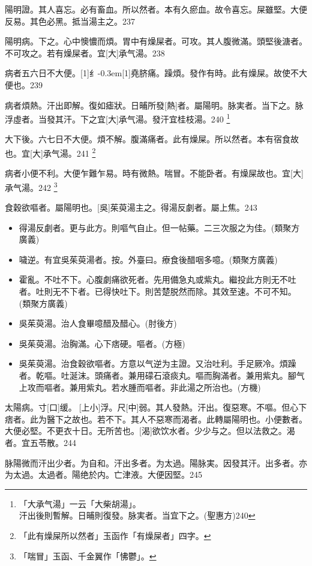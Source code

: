 \documentclass[oneside,b4paper]{ctexbook}
\begin{document}
\begin{flushleft}
陽明證。其人喜忘。必有畜血。所以然者。本有久瘀血。故令喜忘。屎雖堅。大便反易。其色必黑。抵当湯主之。237

陽明病。下之。心中懊憹而煩。胃中有燥屎者。可攻。其人腹微滿。頭堅後溏者。不可攻之。若有燥屎者。宜[大]承气湯。238

病者五六日不大便。{\hbox{\scalebox{0.6}[1]{纟}\kern-0.3em\scalebox{0.63}[1]{堯}}}脐痛。躁煩。發作有時。此有燥屎。故使不大便也。239

病者煩熱。汗出即解。復如瘧狀。日晡所發[熱]者。屬陽明。脉実者。当下之。脉浮虛者。当發其汗。下之宜[大]承气湯。發汗宜桂枝湯。240
\footnote{「大承气湯」一云「大柴胡湯」。\\汗出後則暫解。日晡則復發。脉実者。当宜下之。(聖惠方)240}

大下後。六七日不大便。煩不解。腹滿痛者。此有燥屎。所以然者。本有宿食故也。宜[大]承气湯。241
\footnote{「此有燥屎所以然者」玉函作「有燥屎者」四字。}

病者小便不利。大便乍難乍易。時有微熱。喘冒。不能卧者。有燥屎故也。宜[大]承气湯。242
\footnote{「喘冒」玉函、千金翼作「怫鬱」。}

食穀欲嘔者。屬陽明也。[吳]茱萸湯主之。得湯反劇者。屬上焦。243

\begin{itemize}
\item 得湯反劇者。更与此方。則嘔气自止。但一帖藥。二三次服之为佳。(類聚方廣義)
\item 噦逆。有宜吳茱萸湯者。按。外臺曰。療食後醋咽多噫。(類聚方廣義)
\item 霍亂。不吐不下。心腹劇痛欲死者。先用備急丸或紫丸。繼投此方則无不吐者。吐則无不下者。已得快吐下。則苦楚脱然而除。其效至速。不可不知。(類聚方廣義)
\item 吳茱萸湯。治人食畢噫醋及醋心。(肘後方)
\item 吳茱萸湯。治胸滿。心下痞硬。嘔者。(方極)
\item 吳茱萸湯。治食穀欲嘔者。方意以气逆为主證。又治吐利。手足厥冷。煩躁者。乾嘔。吐涎沫。頭痛者。兼用礞石滾痰丸。嘔而胸滿者。兼用紫丸。腳气上攻而嘔者。兼用紫丸。若水腫而嘔者。非此湯之所治也。(方機)
\end{itemize}

太陽病。寸[口]缓。{𬮦}[上小]浮。尺[中]弱。其人發熱。汗出。復惡寒。不嘔。但心下痞者。此为醫下之故也。若不下。其人不惡寒而渴者。此轉屬陽明也。小便數者。大便必堅。不更衣十日。无所苦也。[渴]欲饮水者。少少与之。但以法救之。渴者。宜五苓散。244

脉陽微而汗出少者。为自和。汗出多者。为太過。陽脉実。因發其汗。出多者。亦为太過。太過者。陽绝於内。亡津液。大便因堅。245


\end{flushleft}
\end{document}
